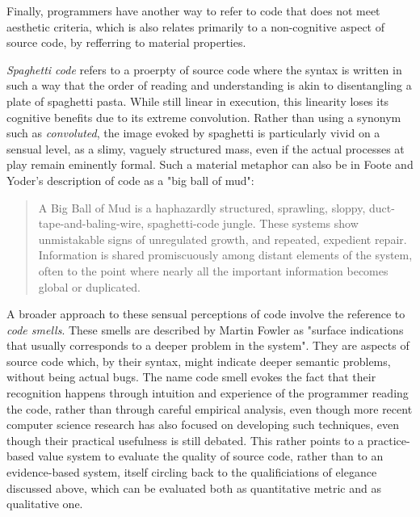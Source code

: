 Finally, programmers have another way to refer to code that does not meet aesthetic criteria, which is also relates primarily to a non-cognitive aspect of source code, by refferring to material properties.

\emph{Spaghetti code} refers to a proerpty of source code where the syntax is written in such a way that the order of reading and understanding is akin to disentangling a plate of spaghetti pasta. While still linear in execution, this linearity loses its cognitive benefits due to its extreme convolution. Rather than using a synonym such as \emph{convoluted}, the image evoked by spaghetti is particularly vivid on a sensual level, as a slimy, vaguely structured mass, even if the actual processes at play remain eminently formal\cite{steele_macaroni_1977}. Such a material metaphor can also be in Foote and Yoder's description of code as a "big ball of mud":

\begin{quote}
  A Big Ball of Mud is a haphazardly structured, sprawling, sloppy, duct-tape-and-baling-wire, spaghetti-code jungle. These systems show unmistakable signs of unregulated growth, and repeated, expedient repair. Information is shared promiscuously among distant elements of the system, often to the point where nearly all the important information becomes global or duplicated.\cite{foote_big_1997}
\end{quote}

A broader approach to these sensual perceptions of code involve the reference to \emph{code smells}. These smells are described by Martin Fowler as "surface indications that usually corresponds to a deeper problem in the system"\cite{fowler_refactoring_1999}. They are aspects of source code which, by their syntax, might indicate deeper semantic problems, without being actual bugs. The name code smell evokes the fact that their recognition happens through intuition and experience of the programmer reading the code, rather than through careful empirical analysis, even though more recent computer science research has also focused on developing such techniques\cite{rasool_review_2015}, even though their practical usefulness is still debated\cite{santos_systematic_2018}. This rather points to a practice-based value system to evaluate the quality of source code, rather than to an evidence-based system, itself circling back to the qualificiations of elegance discussed above, which can be evaluated both as quantitative metric and as qualitative one.

\vspace*{1\baselineskip}

